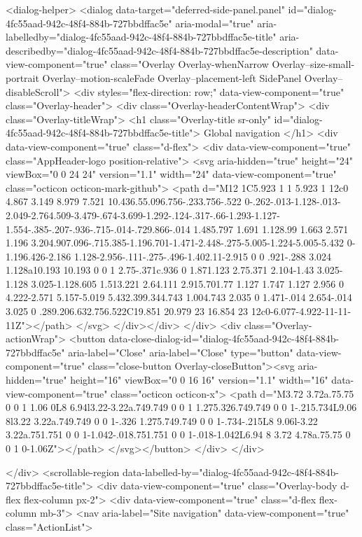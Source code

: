 <dialog-helper>
  <dialog data-target="deferred-side-panel.panel" id="dialog-4fc55aad-942c-48f4-884b-727bbdffac5e" aria-modal="true" aria-labelledby="dialog-4fc55aad-942c-48f4-884b-727bbdffac5e-title" aria-describedby="dialog-4fc55aad-942c-48f4-884b-727bbdffac5e-description" data-view-component="true" class="Overlay Overlay-whenNarrow Overlay--size-small-portrait Overlay--motion-scaleFade Overlay--placement-left SidePanel Overlay--disableScroll">
    <div styles="flex-direction: row;" data-view-component="true" class="Overlay-header">
  <div class="Overlay-headerContentWrap">
    <div class="Overlay-titleWrap">
      <h1 class="Overlay-title sr-only" id="dialog-4fc55aad-942c-48f4-884b-727bbdffac5e-title">
        Global navigation
      </h1>
            <div data-view-component="true" class="d-flex">
      <div data-view-component="true" class="AppHeader-logo position-relative">
        <svg aria-hidden="true" height="24" viewBox="0 0 24 24" version="1.1" width="24" data-view-component="true" class="octicon octicon-mark-github">
    <path d="M12 1C5.923 1 1 5.923 1 12c0 4.867 3.149 8.979 7.521 10.436.55.096.756-.233.756-.522 0-.262-.013-1.128-.013-2.049-2.764.509-3.479-.674-3.699-1.292-.124-.317-.66-1.293-1.127-1.554-.385-.207-.936-.715-.014-.729.866-.014 1.485.797 1.691 1.128.99 1.663 2.571 1.196 3.204.907.096-.715.385-1.196.701-1.471-2.448-.275-5.005-1.224-5.005-5.432 0-1.196.426-2.186 1.128-2.956-.111-.275-.496-1.402.11-2.915 0 0 .921-.288 3.024 1.128a10.193 10.193 0 0 1 2.75-.371c.936 0 1.871.123 2.75.371 2.104-1.43 3.025-1.128 3.025-1.128.605 1.513.221 2.64.111 2.915.701.77 1.127 1.747 1.127 2.956 0 4.222-2.571 5.157-5.019 5.432.399.344.743 1.004.743 2.035 0 1.471-.014 2.654-.014 3.025 0 .289.206.632.756.522C19.851 20.979 23 16.854 23 12c0-6.077-4.922-11-11-11Z"></path>
</svg>
</div></div>
    </div>
    <div class="Overlay-actionWrap">
      <button data-close-dialog-id="dialog-4fc55aad-942c-48f4-884b-727bbdffac5e" aria-label="Close" aria-label="Close" type="button" data-view-component="true" class="close-button Overlay-closeButton"><svg aria-hidden="true" height="16" viewBox="0 0 16 16" version="1.1" width="16" data-view-component="true" class="octicon octicon-x">
    <path d="M3.72 3.72a.75.75 0 0 1 1.06 0L8 6.94l3.22-3.22a.749.749 0 0 1 1.275.326.749.749 0 0 1-.215.734L9.06 8l3.22 3.22a.749.749 0 0 1-.326 1.275.749.749 0 0 1-.734-.215L8 9.06l-3.22 3.22a.751.751 0 0 1-1.042-.018.751.751 0 0 1-.018-1.042L6.94 8 3.72 4.78a.75.75 0 0 1 0-1.06Z"></path>
</svg></button>
    </div>
  </div>
  
</div>
      <scrollable-region data-labelled-by="dialog-4fc55aad-942c-48f4-884b-727bbdffac5e-title">
        <div data-view-component="true" class="Overlay-body d-flex flex-column px-2">    <div data-view-component="true" class="d-flex flex-column mb-3">
        <nav aria-label="Site navigation" data-view-component="true" class="ActionList">
  
